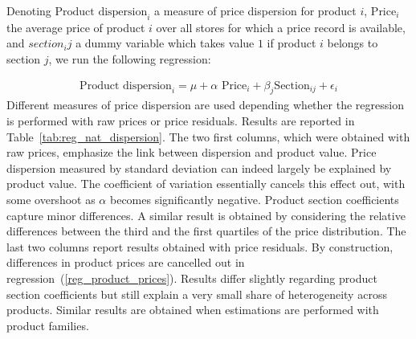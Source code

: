 \documentclass[english]{article}
\begin{document}
Denoting $\text{Product dispersion}_i$ a measure of price dispersion for product $i$, $\text{Price}_i$ the average price of product $i$ over all stores for which a price record is available, and $section_ij$ a dummy variable which takes value $1$ if product $i$ belongs to section $j$, we run the following regression:

\begin{align}
\text{Product dispersion}_i = \mu + \alpha \text{ Price}_i + \beta_j \text{Section}_{ij} + \epsilon_i
\label{reg_store_dispersion}
\end{align}
Different measures of price dispersion are used depending whether the regression is performed with raw prices or price residuals. Results are reported in Table~\ref{tab:reg_nat_dispersion}. The two first columns, which were obtained with raw prices, emphasize the link between dispersion and product value. Price dispersion measured by standard deviation can indeed largely be explained by product value. The coefficient of variation essentially cancels this effect out, with some overshoot as $\alpha$ becomes significantly negative. Product section coefficients capture minor differences. A similar result is obtained by considering the relative differences between the third and the first quartiles of the price distribution. The last two columns report results obtained with price residuals. By construction, differences in product prices are cancelled out in regression~(\ref{reg_product_prices}). Results differ slightly regarding product section coefficients but still explain a very small share of heterogeneity across products. Similar results are obtained when estimations are performed with product families.
\end{document}
